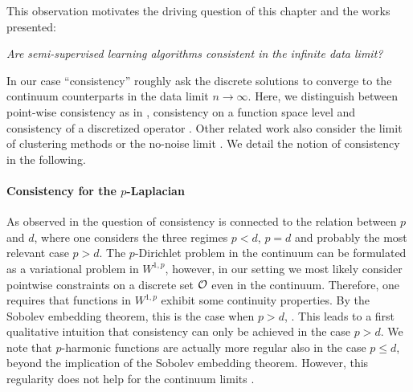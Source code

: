%
%
\noindent%
This observation motivates the driving question of this chapter and the works presented:
%
\begin{center}
\textit{%
Are semi-supervised learning algorithms consistent in the infinite data limit?}
\end{center}
%
In our case \enquote{consistency} roughly ask the discrete solutions to converge to the continuum counterparts in the data limit $n\to\infty$. Here, we distinguish between point-wise consistency as in \cite{von2008consistency, gine2006empirical, hein2005graphs}, consistency on a function space level \cite{slepcev2019analysis, GarcSlep15,calder2019consistency, roith2022continuum, bungert2021uniform} and consistency of a discretized operator \cite{calder2019consistency, bungert2021uniform}. Other related work also consider the limit of clustering methods \cite{hoffmann2022spectral, trillos2018variational} or the no-noise limit \cite{hoffmann2020consistency, dunlop2020large}. We detail the notion of consistency in the following.  
%
%
\paragraph{Consistency for the $p$-Laplacian} 
As observed in \cite{nadler2009statistical, alamgir2011phase, el2016asymptotic, calder2020properly} the question of consistency is connected to the relation between $p$ and $d$, where one considers the three regimes $p<d$, $p=d$ and probably the most relevant case $p>d$. The $p$-Dirichlet problem in the continuum can be formulated as a variational problem in $W^{1,p}$, however, in our setting we most likely consider pointwise constraints on a discrete set $\mathcal{O}$ even in the continuum. Therefore, one requires that functions in $W^{1,p}$ exhibit some continuity properties. By the Sobolev embedding theorem, this is the case when $p>d$, \cite{adams2003sobolev}. This leads to a first qualitative intuition that consistency can only be achieved in the case $p>d$. We note that $p$-harmonic functions are actually more regular also in the case $p\leq d$, beyond the implication of the Sobolev embedding theorem. However, this regularity does not help for the continuum limits \cite{nadler2009statistical, alamgir2011phase, el2016asymptotic}.

